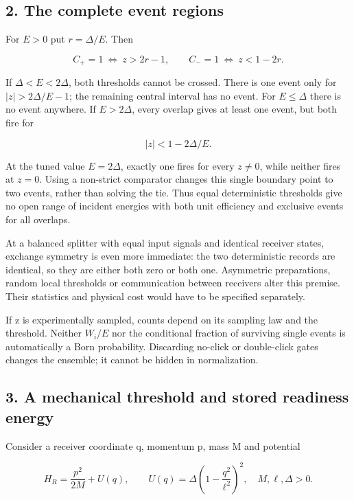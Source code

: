 \documentclass[11pt,a4paper]{article}
\begin{document}
\hypertarget{the-complete-event-regions}{%
\subsection{2. The complete event
regions}\label{the-complete-event-regions}}

For \(E>0\) put \(r=\Delta/E\). Then

\[C_+=1\ \Longleftrightarrow\ z>2r-1,\qquad
C_-=1\ \Longleftrightarrow\ z<1-2r. \tag{3}\]

If \(\Delta<E<2\Delta\), both thresholds cannot be crossed. There is one
event only for \(|z|>2\Delta/E-1\); the remaining central interval has
no event. For \(E\le\Delta\) there is no event anywhere. If
\(E>2\Delta\), every overlap gives at least one event, but both fire for

\[|z|<1-2\Delta/E. \tag{4}\]

At the tuned value \(E=2\Delta\), exactly one fires for every \(z\ne0\),
while neither fires at \(z=0\). Using a non-strict comparator changes
this single boundary point to two events, rather than solving the tie.
Thus equal deterministic thresholds give no open range of incident
energies with both unit efficiency and exclusive events for all
overlaps.

At a balanced splitter with equal input signals and identical receiver
states, exchange symmetry is even more immediate: the two deterministic
records are identical, so they are either both zero or both one.
Asymmetric preparations, random local thresholds or communication
between receivers alter this premise. Their statistics and physical cost
would have to be specified separately.

If z is experimentally sampled, counts depend on its sampling law and
the threshold. Neither \(W_i/E\) nor the conditional fraction of
surviving single events is automatically a Born probability. Discarding
no-click or double-click gates changes the ensemble; it cannot be hidden
in normalization.

\hypertarget{a-mechanical-threshold-and-stored-readiness-energy}{%
\subsection{3. A mechanical threshold and stored readiness
energy}\label{a-mechanical-threshold-and-stored-readiness-energy}}

Consider a receiver coordinate q, momentum p, mass M and potential

\[H_R=\frac{p^2}{2M}+U(q),\qquad
U(q)=\Delta\left(1-\frac{q^2}{\ell^2}\right)^2,
\quad M,\ell,\Delta>0. \tag{5}\]
\end{document}
